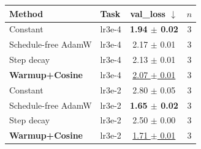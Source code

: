 \begin{tabular}{llcc}
\toprule
Method & Task & val\_loss $\downarrow$ & $n$ \\
\midrule
Constant & lr3e-4 & \textbf{1.94 $\pm$ 0.02} & 3 \\
Schedule-free AdamW & lr3e-4 & 2.17 $\pm$ 0.01 & 3 \\
Step decay & lr3e-4 & 2.13 $\pm$ 0.01 & 3 \\
\textbf{Warmup+Cosine} & lr3e-4 & \underline{2.07 $\pm$ 0.01} & 3 \\
\midrule
Constant & lr3e-2 & 2.80 $\pm$ 0.05 & 3 \\
Schedule-free AdamW & lr3e-2 & \textbf{1.65 $\pm$ 0.02} & 3 \\
Step decay & lr3e-2 & 2.50 $\pm$ 0.00 & 3 \\
\textbf{Warmup+Cosine} & lr3e-2 & \underline{1.71 $\pm$ 0.01} & 3 \\
\bottomrule
\end{tabular}
